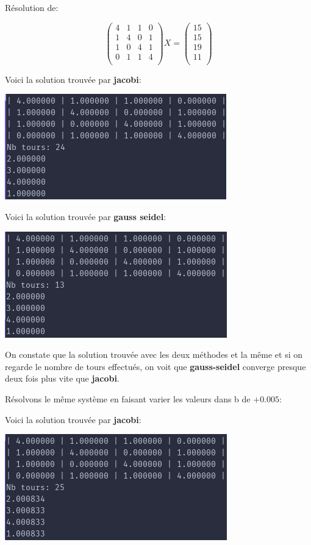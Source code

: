 \documentclass[a4paper]{article}
\begin{document}
Résolution de:

\[
\begin{pmatrix}
  4 & 1 & 1 & 0\\
  1 & 4 & 0 & 1\\
  1 & 0 & 4 & 1\\
  0 & 1 & 1 & 4\\
\end{pmatrix} X =
\begin{pmatrix}
  15\\
  15\\
  19\\
  11\\
\end{pmatrix}
\]

Voici la solution trouvée par \textbf{jacobi}:

\includegraphics[scale=0.5]{./img/jacobi/jac_ex_1.png}

Voici la solution trouvée par \textbf{gauss seidel}:

\includegraphics[scale=0.5]{./img/gauss_seidel/g_e_ex_1.png}

On constate que la solution trouvée avec les deux méthodes et la même et si on
regarde le nombre de tours effectués, on voit que \textbf{gauss-seidel} converge
presque deux fois plus vite que \textbf{jacobi}.

Résolvons le même système en faisant varier les valeurs dans b de $+0.005$:

Voici la solution trouvée par \textbf{jacobi}:

\includegraphics[scale=0.5]{./img/jacobi/jac_ex_1_mod.png}
\end{document}
